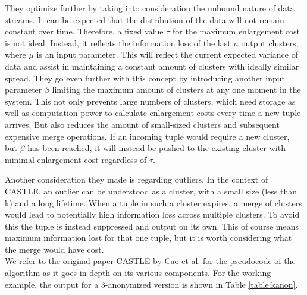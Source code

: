 They optimize further by taking into consideration the unbound nature of data streams. It can be expected that the distribution of the data will not remain constant over time. Therefore, a fixed value $\tau$ for the maximum enlargement cost is not ideal. Instead, it reflects the information loss of the last $\mu$ output clusters, where $\mu$ is an input parameter. This will reflect the current expected variance of data and assist in maintaining a constant amount of clusters with ideally similar spread. They go even further with this concept by introducing another input parameter $\beta$ limiting the maximum amount of clusters at any one moment in the system. This not only prevents large numbers of clusters, which need storage as well as computation power to calculate enlargement costs every time a new tuple arrives. But also reduces the amount of small-sized clusters and subsequent expensive merge operations. If an incoming tuple would require a new cluster, but $\beta$ has been reached, it will instead be pushed to the existing cluster with minimal enlargement cost regardless of $\tau$. \par

Another consideration they made is regarding outliers. In the context of CASTLE, an outlier can be understood as a cluster, with a small size (less than k) and a long lifetime. When a tuple in such a cluster expires, a merge of clusters would lead to potentially high information loss across multiple clusters. To avoid this the tuple is instead suppressed and output on its own. This of course means maximum information lost for that one tuple, but it is worth considering what the merge would have cost. \\ 
We refer to the original paper CASTLE by Cao et al. \cite{Cao2008} for the pseudocode of the algorithm as it goes in-depth on its various components. For the working example, the output for a 3-anonymized version is shown in Table \ref{table:kanon}.


